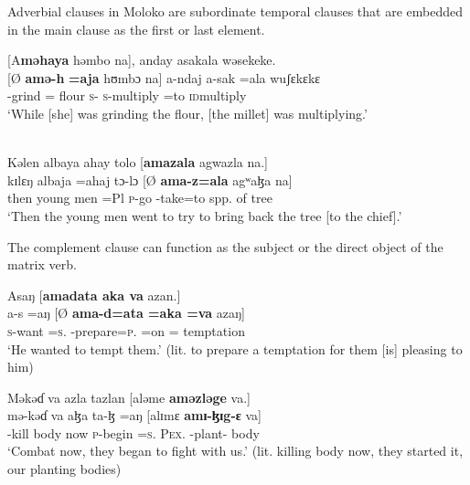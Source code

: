 Adverbial clauses in Moloko are subordinate temporal clauses that are embedded in the main clause as the first  or last  element. 

\clearpage
\ea\label{ex:7:173}
{}[A\textbf{məhaya}  həmbo  na],  anday  asakala  wəsekeke.\\
\gll  {}[Ø  \textbf{amə-h}  \textbf{=aja}  hʊmbɔ  na]  a-ndaj    a-sak    =ala  wuʃɛkɛkɛ\\
      {} {\DEP}-grind  ={\PLU}  flour  {\PSP}  \textsc{s}-{\PRG}    \textsc{s}-multiply  =to  \textsc{id}multiply\\
\glt  ‘While [she] was grinding the flour, [the millet] was multiplying.’\\
\z 

\ea\label{ex:7:174} \\
Kəlen  albaya  ahay  tolo  [\textbf{amazala}  agwazla  na.]\\
\gll  kɪlɛŋ  albaja    =ahaj  tɔ-lɔ  [Ø \textbf{ama-z=ala}  agʷaɮa    na]\\
      then    {young men}  =Pl  \textsc{p}-go   {}  {\DEP}-take=to  {spp. of tree}  {\PSP}\\
\glt  ‘Then the young men went to try to bring back the tree [to the chief].’\\
\z 

The complement clause can function as the subject  or the direct object  of the matrix verb.

\ea\label{ex:7:175}
Asaŋ  [\textbf{amadata  aka  va}  azan.]\\
\gll  a-s    =aŋ     [Ø   \textbf{ama-d=ata =aka     =va }  azaŋ]\\
      \textsc{s}-want  =\textsc{s}.{\IO}  {}  {\DEP}-prepare=\textsc{p}.{\IO} =on     ={\PRF}  temptation\\
\glt  ‘He wanted to tempt them.’ (lit. to prepare a temptation for them [is] pleasing to him)\\
\z 

\ea\label{ex:7:176}
Məkəɗ  va  azla  tazlan  [aləme  \textbf{aməzləge}  va.]\\
\gll  mə-kəɗ  va   aɮa  ta-ɮ  =aŋ     [alɪmɛ  \textbf{amɪ-ɮɪg-ɛ}  va]\\
    {\NOM}-kill  body   now  \textsc{p}-begin =\textsc{s}.{\IO}   \textsc{Pex}.{\POSS}   {\DEP}-plant-{\CL}  body\\
\glt  ‘Combat now, they began to fight with us.’ (lit. killing body now, they started it, our planting bodies)\\
\z 
